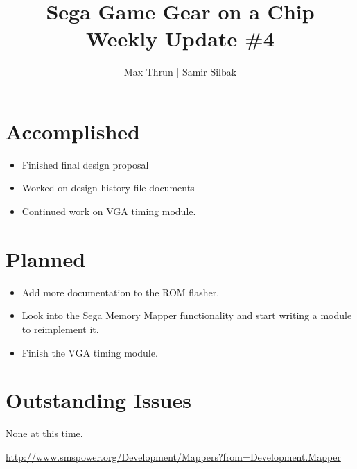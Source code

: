 \documentclass[12pt]{article}
\title{Sega Game Gear on a Chip \\ Weekly Update \#4}
\author{ Max Thrun | Samir Silbak }
\begin{document}
\maketitle

\section*{Accomplished}
\begin{itemize}
    \item Finished final design proposal
    \item Worked on design history file documents
    \item Continued work on VGA timing module.
\end{itemize}

\section*{Planned}
\begin{itemize}
    \item Add more documentation to the ROM flasher.
    \item Look into the Sega Memory Mapper\cite{mapper} functionality and start writing a module to reimplement it.
    \item Finish the VGA timing  module.
\end{itemize}

\section*{Outstanding Issues}
None at this time.

\vspace{.1in}
\begin{thebibliography}{9}
     \url{http://www.smspower.org/Development/Mappers?from=Development.Mapper}
\end{thebibliography}
\end{document}

